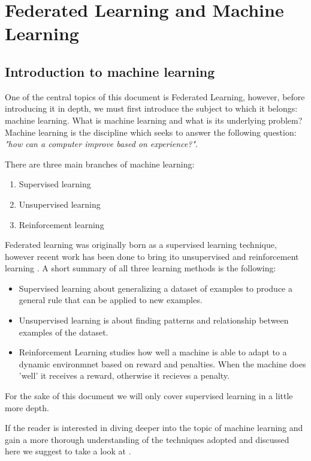 \chapter{Federated Learning and Machine Learning} \label{chap:federated-learning}
\section{Introduction to machine learning}
One of the central topics of this document is Federated Learning, however, before introducing it in depth, we
must first introduce the subject to which it belongs: machine learning.
What is machine learning and what is its underlying problem? Machine
learning is the discipline which seeks to answer the following
question: \emph{"how can a computer improve based on experience?"}.

There are three main branches of machine learning:
\begin{enumerate}
  \item Supervised learning
  \item Unsupervised learning
  \item Reinforcement learning
\end{enumerate}

Federated learning was originally born as a supervised learning technique, however recent work has been done to bring
ito unsupervised \cite{UnsupervisedFL} and reinforcement learning \cite{ReinforcementFL}.
A short summary of all three learning methods is the following:
\begin{itemize}
  \item Supervised learning about generalizing a dataset of examples to produce a general rule that can be
    applied to new examples.
  \item Unsupervised learning is about finding patterns and relationship between examples of the dataset.
  \item Reinforcement Learning studies how well a machine is able to adapt to a dynamic environmnet based on
    reward and penalties.
    When the machine does 'well' it receives a reward, otherwise it recieves a penalty.
\end{itemize}
For the sake of this document we will only cover supervised learning in a little more depth.

If the reader is interested in diving deeper into the topic of machine learning and gain a more thorough
understanding of the techniques adopted and discussed here we suggest to take a look at \cite{MLBook}.

